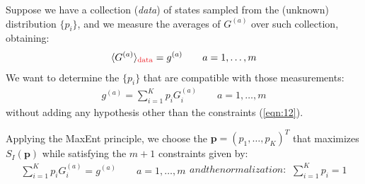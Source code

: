 \documentclass[../template.tex]{subfiles}
\begin{document}
\medskip

Suppose we have a collection (\textit{data}) of states sampled from the (unknown) distribution $\{p_i\}$, and we measure the averages of $G^{(a)}$ over such collection, obtaining:
\begin{align}\label{eqn:11}
    \langle G^{(a)} \rangle_{\textcolor{Red}{\rm{data}}} = g^{(a)} \qquad a=1,\dots,m
\end{align}
We want to determine the $\{p_i\}$ that are compatible with those measurements:
\begin{align}\label{eqn:12}
    g^{(a)} = \sum_{i=1}^K p_i G_i^{(a)} \qquad a=1,\dots,m
\end{align}
without adding any  hypothesis other than the constraints (\ref{eqn:12}).

\medskip

Applying the MaxEnt principle, we choose the $\bm{p} = (p_1, \dots, p_K)^T$ that maximizes $S_I(\bm{p})$ while satisfying the $m+1$ constraints given by:
\begin{subequations}
\begin{align}\label{eqn:13a}
    \sum_{i=1}^K p_i G_i^{(a)} = g^{(a)} \qquad a=1,\dots,m
\end{align} 
and the normalization:
\begin{align}
    \sum_{i=1}^K p_i = 1
    \label{eqn:13b}
\end{align}
\end{subequations}
\end{document}
